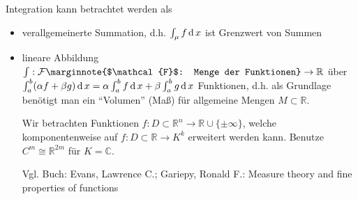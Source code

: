 Integration kann betrachtet werden als
\begin{itemize}
	\item verallgemeinerte Summation, d.h. $\int_\mu f\operatorname{d} x$ ist Grenzwert von Summen
	\item lineare Abbildung $\int: \mathcal{F}\marginnote{$\mathcal{F}$: Menge der Funktionen}\to \mathbb{R}$ über $\int_a^b (\alpha f + \beta g)\operatorname{d} x = \alpha \int_a^b f \operatorname{d} x + \beta \int_a^b g \operatorname{d} x$ Funktionen, d.h. als Grundlage benötigt man ein "`Volumen"' (Maß) für allgemeine Mengen $M\subset\mathbb{R}$.
	
	Wir betrachten Funktionen $f:D\subset\mathbb{R}^n\to \mathbb{R}\cup \{ \pm \infty \}$, welche komponentenweise auf $f:D\subset\mathbb{R}\to K^k$ erweitert werden kann. Benutze $C^m \cong \mathbb{R}^{2m}$ für $K=\mathbb{C}$.
	
	Vgl. Buch:  Evans, Lawrence C.; Gariepy, Ronald F.: Measure theory and fine properties of functions
\end{itemize}